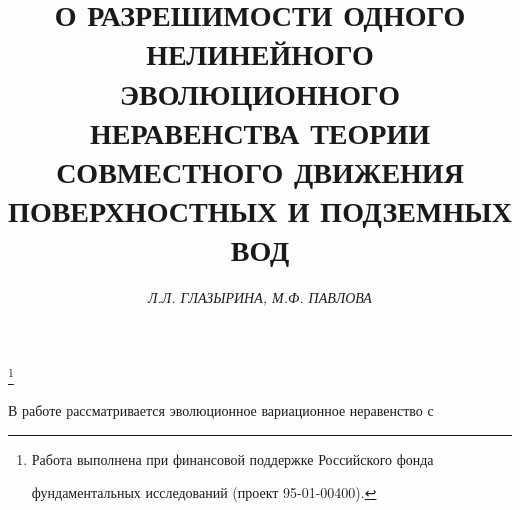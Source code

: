 






 




\newcommand{\oc}{\overset{\circ}} 


\newcommand{\mes}{\operatorname{mes}} 


\newcommand{\const}{\operatorname{const}} 


 


\setcounter{page}{20} 








\author{\it Л.Л. ГЛАЗЫРИНА, М.Ф. ПАВЛОВА} 


\title{О РАЗРЕШИМОСТИ ОДНОГО НЕЛИНЕЙНОГО ЭВОЛЮЦИОННОГО\\


НЕРАВЕНСТВА ТЕОРИИ СОВМЕСТНОГО ДВИЖЕНИЯ\\


ПОВЕРХНОСТНЫХ И ПОДЗЕМНЫХ ВОД } 


 


\thanks{Работа выполнена при финансовой поддержке Российского фонда 


фундаментальных исследований (проект 95-01-00400).


} 


\date{} 


\pagestyle{plain} 


 


 


\maketitle 


 


В работе рассматривается эволюционное вариационное неравенство с 


